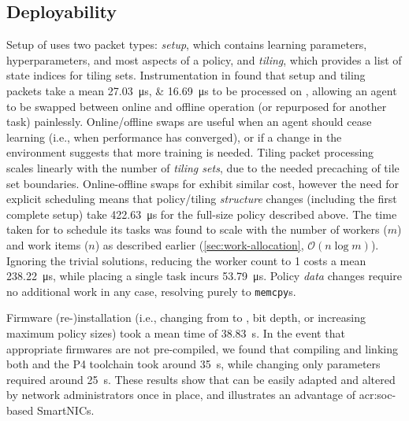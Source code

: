 %

\subsection{Deployability}
Setup of \approachshort{} uses two packet types: \emph{setup}, which contains learning parameters, hyperparameters, and most aspects of a policy, and \emph{tiling}, which provides a list of state indices for tiling sets.
Instrumentation in \approachshort{} found that setup and tiling packets take a mean \qtylist{27.03;16.69}{\micro\second} to be processed on \Indfw{}, allowing an agent to be swapped between online and offline operation (or repurposed for another task) painlessly.
Online/offline swaps are useful when an agent should cease learning (i.e., when performance has converged), or if a change in the environment suggests that more training is needed.
Tiling packet processing scales linearly with the number of \emph{tiling sets}, due to the needed precaching of tile set boundaries.
Online-offline swaps for \Coopfw{} exhibit similar cost, however the need for explicit scheduling means that policy/tiling \emph{structure} changes (including the first complete setup) take \qty{422.63}{\micro\second} for the full-size policy described above.
The time taken for \Coopfw{} to schedule its tasks was found to scale with the number of workers ($m$) and work items ($n$) as described earlier (\cref{sec:work-allocation}, $\mathcal{O}{\left(n\log{m}\right)}$).
Ignoring the trivial solutions, reducing the worker count to \num{1} costs a mean \qty{238.22}{\micro\second}, while placing a single task incurs \qty{53.79}{\micro\second}.
Policy \emph{data} changes require no additional work in any case, resolving purely to \texttt{memcpy}s.

Firmware (re-)installation (i.e., changing from \Indfw{} to \Coopfw{}, bit depth, or increasing maximum policy sizes) took a mean time of \qty{38.83}{\second}.
In the event that appropriate firmwares are not pre-compiled, we found that compiling and linking both \approachshort{} and the P4 toolchain took around \qty{35}{\second}, while changing only \approachshort{} parameters required around \qty{25}{\second}.
These results show that \approachshort{} can be easily adapted and altered by network administrators once in place, and illustrates an advantage of \gls{acr:soc}-based SmartNICs.

